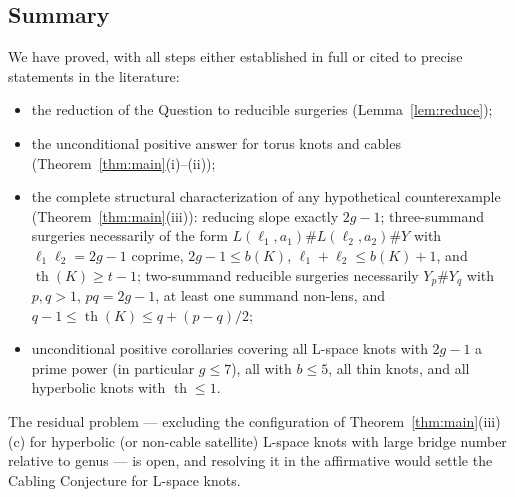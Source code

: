 \documentclass[11pt]{amsart}
\theoremstyle{definition}
\theoremstyle{remark}
\numberwithin{equation}{section}
\begin{document}
\subsection{Summary}

We have proved, with all steps either established in full or cited to
precise statements in the literature:
\begin{itemize}
\item the reduction of the Question to reducible surgeries
(Lemma~\ref{lem:reduce});
\item the unconditional positive answer for torus knots and cables
(Theorem~\ref{thm:main}(i)--(ii));
\item the complete structural characterization of any hypothetical
counterexample (Theorem~\ref{thm:main}(iii)): reducing slope exactly
$2g-1$; three-summand surgeries necessarily of the form
$L(\ell_{1},a_{1})\#L(\ell_{2},a_{2})\#Y$ with $\ell_{1}\ell_{2}=2g-1$
coprime, $2g-1\le b(K)$, $\ell_{1}+\ell_{2}\le b(K)+1$, and
$\operatorname{th}(K)\ge t-1$; two-summand reducible surgeries
necessarily $Y_{p}\#Y_{q}$ with $p,q>1$, $pq=2g-1$, at least one summand
non-lens, and $q-1\le\operatorname{th}(K)\le q+(p-q)/2$;
\item unconditional positive corollaries covering all L-space knots with
$2g-1$ a prime power (in particular $g\le7$), all with $b\le5$, all thin
knots, and all hyperbolic knots with $\operatorname{th}\le1$.
\end{itemize}
The residual problem --- excluding the configuration of
Theorem~\ref{thm:main}(iii)(c) for hyperbolic (or non-cable satellite)
L-space knots with large bridge number relative to genus --- is open,
and resolving it in the affirmative would settle the Cabling Conjecture
for L-space knots.
\end{document}

